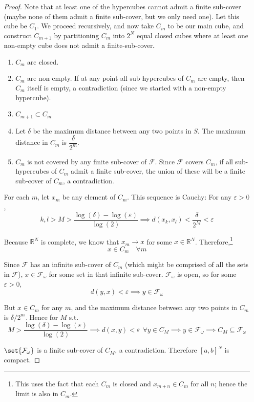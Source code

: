 \documentclass{article}
\begin{document}
\begin{proof}
  Note that at least one of the hypercubes cannot admit a finite sub-cover (maybe none of them admit a finite sub-cover, but we only need one). Let this cube be $C_1$. We proceed recursively, and now take $C_m$ to be our main cube, and construct $C_{m + 1}$ by partitioning $C_m$ into $2^N$ equal closed cubes where at least one non-empty cube does not admit a finite-sub-cover.
  \begin{enumerate}
    \item $C_m$ are closed.

    \item $C_m$ are non-empty. If at any point all sub-hypercubes of $C_m$ are empty, then $C_m$ itself is empty, a contradiction (since we started with a non-empty hypercube).

    \item $C_{m + 1} \subset C_m$

    \item Let $\delta$ be the maximum distance between any two points in $S$. The maximum distance in $C_m$ is $\dfrac{\delta}{2^m}$.

    \item $C_m$ is not covered by any finite sub-cover of $\mathcal{F}$. Since $\mathcal{F}$ covers $C_m$, if all sub-hypercubes of $C_m$ admit a finite sub-cover, the union of these will be a finite sub-cover of $C_m$, a contradiction.
  \end{enumerate}

  For each $m$, let $x_m$ be any element of $C_m$. This sequence is Cauchy: For any $\varepsilon > 0$,
  \[
    k, l > M > \dfrac{\log(\delta) - \log(\varepsilon)}{\log(2)}
    \implies
    d(x_k, x_l)
    <
    \dfrac{\delta}{2^M}
    <
    \varepsilon
  \]

  Because $\mathbb{R}^N$ is complete, we know that $x_m \to x$ for some $x \in \mathbb{R}^N$. Therefore,\footnote{This uses the fact that each $C_m$ is closed and $x_{m + n} \in C_m$ for all $n$; hence the limit is also in $C_m$.}
  \[
    x \in C_m
    \quad
    \forall m
  \]

  Since $\mathcal{F}$ has an infinite sub-cover of $C_m$ (which might be comprised of all the sets in $\mathcal{F}$), $x \in \mathcal{F}_\omega$ for some set in that infinite sub-cover. $\mathcal{F}_\omega$ is open, so for some $\varepsilon > 0$,
  \[
    d(y, x) < \varepsilon \implies y \in \mathcal{F}_\omega
  \]

  But $x \in C_m$ for any $m$, and the maximum distance between any two points in $C_m$ is $\delta / 2^m$. Hence for $M$ s.t.
  \[
    M > \dfrac{\log(\delta) - \log(\varepsilon)}{\log(2)}
    \implies
    d(x, y) < \varepsilon ~~ \forall y \in C_M
    \implies
    y \in \mathcal{F}_\omega
    \implies
    C_M \subseteq \mathcal{F}_\omega
  \]

  $\set{\mathcal{F}_\omega}$ is a finite sub-cover of $C_M$, a contradiction. Therefore $[a, b]^N$ is compact.
\end{proof}
\end{document}
